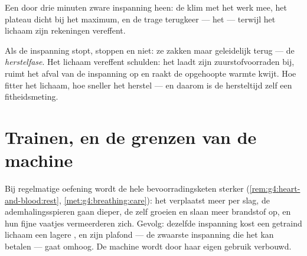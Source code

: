 \begin{omfigure}

{\small Een  door drie minuten zware inspanning heen: de klim met
het werk mee, het plateau dicht bij het maximum, en de trage terugkeer ---
het  --- terwijl het lichaam zijn rekeningen vereffent.}
\end{omfigure}

\begin{definition}[Herstel]\label{def:g7:organs-at-work:recovery}
Als de inspanning stopt, stoppen  en  niet: ze zakken
maar geleidelijk terug --- de \emph{herstelfase}. Het
lichaam vereffent schulden: het laadt zijn zuurstofvoorraden bij, ruimt
het afval van de inspanning op en raakt de opgehoopte warmte kwijt. Hoe
fitter het lichaam, hoe sneller het herstel --- en daarom is de hersteltijd
zelf een fitheidsmeting.
\end{definition}

\section{Trainen, en de grenzen van de machine}

\begin{proposition}\label{prop:g7:organs-at-work:training}
Bij regelmatige oefening wordt de hele bevoorradingsketen sterker
(\cref{rem:g4:heart-and-blood:rest},
\cref{met:g4:breathing:care}): het  verplaatst meer  per slag, de
ademhalingsspieren gaan dieper, de  zelf groeien en slaan meer
brandstof op, en hun fijne vaatjes vermeerderen zich. Gevolg: dezelfde
inspanning kost een getraind lichaam een lagere , en zijn plafond
--- de zwaarste inspanning die het kan betalen --- gaat omhoog. De machine
wordt door haar eigen gebruik verbouwd.
\end{proposition}
\admitted

